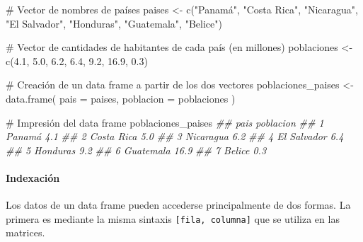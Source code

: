 \documentclass[
  letterpaper,
  DIV=11,
  numbers=noendperiod]{scrreprt}
\let\oldparagraph\paragraph
\renewcommand{\paragraph}[1]{\oldparagraph{#1}\mbox{}}
\newenvironment{Shaded}{\begin{snugshade}}{\end{snugshade}}
\newcommand{\AttributeTok}[1]{\textcolor[rgb]{0.40,0.45,0.13}{#1}}
\newcommand{\CommentTok}[1]{\textcolor[rgb]{0.37,0.37,0.37}{#1}}
\newcommand{\DocumentationTok}[1]{\textcolor[rgb]{0.37,0.37,0.37}{\textit{#1}}}
\newcommand{\FloatTok}[1]{\textcolor[rgb]{0.68,0.00,0.00}{#1}}
\newcommand{\FunctionTok}[1]{\textcolor[rgb]{0.28,0.35,0.67}{#1}}
\newcommand{\NormalTok}[1]{\textcolor[rgb]{0.00,0.23,0.31}{#1}}
\newcommand{\OtherTok}[1]{\textcolor[rgb]{0.00,0.23,0.31}{#1}}
\newcommand{\StringTok}[1]{\textcolor[rgb]{0.13,0.47,0.30}{#1}}
\begin{document}
\begin{Shaded}
\begin{Highlighting}[]
\CommentTok{\# Vector de nombres de países}
\NormalTok{paises }\OtherTok{\textless{}{-}}
  \FunctionTok{c}\NormalTok{(}\StringTok{"Panamá"}\NormalTok{,}
    \StringTok{"Costa Rica"}\NormalTok{,}
    \StringTok{"Nicaragua"}\NormalTok{,}
    \StringTok{"El Salvador"}\NormalTok{,}
    \StringTok{"Honduras"}\NormalTok{,}
    \StringTok{"Guatemala"}\NormalTok{,}
    \StringTok{"Belice"}\NormalTok{)}

\CommentTok{\# Vector de cantidades de habitantes de cada país (en millones)}
\NormalTok{poblaciones }\OtherTok{\textless{}{-}} \FunctionTok{c}\NormalTok{(}\FloatTok{4.1}\NormalTok{, }\FloatTok{5.0}\NormalTok{, }\FloatTok{6.2}\NormalTok{, }\FloatTok{6.4}\NormalTok{, }\FloatTok{9.2}\NormalTok{, }\FloatTok{16.9}\NormalTok{, }\FloatTok{0.3}\NormalTok{)}

\CommentTok{\# Creación de un data frame a partir de los dos vectores}
\NormalTok{poblaciones\_paises }\OtherTok{\textless{}{-}} 
  \FunctionTok{data.frame}\NormalTok{(}
    \AttributeTok{pais =}\NormalTok{ paises, }
    \AttributeTok{poblacion =}\NormalTok{ poblaciones}
\NormalTok{  )}

\CommentTok{\# Impresión del data frame}
\NormalTok{poblaciones\_paises}
\DocumentationTok{\#\#          pais poblacion}
\DocumentationTok{\#\# 1      Panamá       4.1}
\DocumentationTok{\#\# 2  Costa Rica       5.0}
\DocumentationTok{\#\# 3   Nicaragua       6.2}
\DocumentationTok{\#\# 4 El Salvador       6.4}
\DocumentationTok{\#\# 5    Honduras       9.2}
\DocumentationTok{\#\# 6   Guatemala      16.9}
\DocumentationTok{\#\# 7      Belice       0.3}
\end{Highlighting}
\end{Shaded}

\hypertarget{indexaciuxf3n-2}{%
\paragraph{Indexación}\label{indexaciuxf3n-2}}

Los datos de un data frame pueden accederse principalmente de dos
formas. La primera es mediante la misma sintaxis
\texttt{{[}fila,\ columna{]}} que se utiliza en las matrices.
\end{document}
